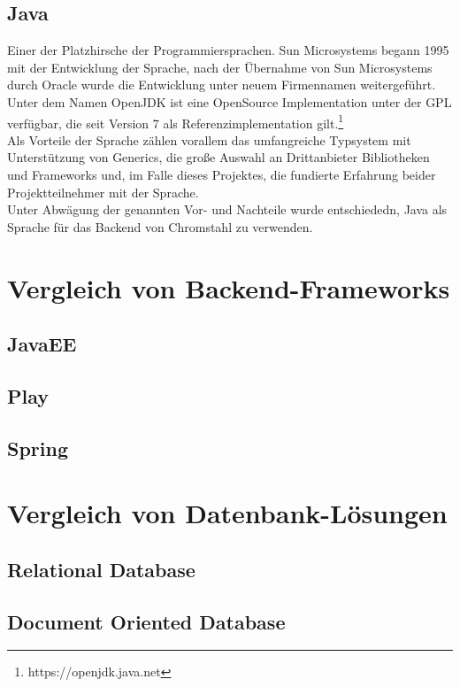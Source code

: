 \subsection{Java}
Einer der Platzhirsche der Programmiersprachen. Sun Microsystems begann 1995 mit
der Entwicklung der Sprache, nach der Übernahme von Sun Microsystems durch Oracle wurde die
Entwicklung unter neuem Firmennamen weitergeführt. Unter dem Namen OpenJDK ist
eine OpenSource Implementation unter der \ac{GPL} verfügbar, die seit Version 7 als
Referenzimplementation gilt.\footnote{https://openjdk.java.net}\\
Als Vorteile der Sprache zählen vorallem das umfangreiche Typsystem mit
Unterstützung von Generics, die große Auswahl an Drittanbieter Bibliotheken und Frameworks und,
im Falle dieses Projektes, die fundierte Erfahrung beider Projektteilnehmer mit
der Sprache.\\
Unter Abwägung der genannten Vor- und Nachteile wurde entschiededn, Java als
Sprache für das Backend von Chromstahl zu verwenden.
\section{Vergleich von Backend-Frameworks}
\subsection{JavaEE}
\subsection{Play}
\subsection{Spring}
\section{Vergleich von Datenbank-Lösungen}
\subsection{Relational Database}
\subsection{Document Oriented Database}